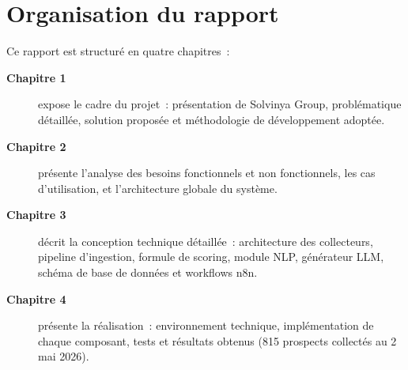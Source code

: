\section*{Organisation du rapport}

Ce rapport est structuré en quatre chapitres~:

\begin{description}
  \item[\textbf{Chapitre 1}] expose le cadre du projet~: présentation de Solvinya
    Group, problématique détaillée, solution proposée et méthodologie de
    développement adoptée.

  \item[\textbf{Chapitre 2}] présente l'analyse des besoins fonctionnels et
    non fonctionnels, les cas d'utilisation, et l'architecture globale du système.

  \item[\textbf{Chapitre 3}] décrit la conception technique détaillée~:
    architecture des collecteurs, pipeline d'ingestion, formule de scoring,
    module NLP, générateur LLM, schéma de base de données et workflows n8n.

  \item[\textbf{Chapitre 4}] présente la réalisation~: environnement technique,
    implémentation de chaque composant, tests et résultats obtenus (815 prospects
    collectés au 2 mai 2026).
\end{description}

\newpage
